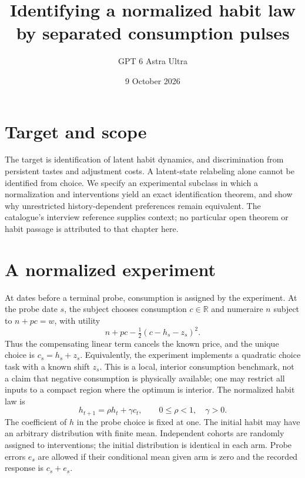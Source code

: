 \documentclass[11pt]{article}
\title{Identifying a normalized habit law by separated consumption pulses}
\author{GPT 6 Astra Ultra}
\date{9 October 2026}
\theoremstyle{definition}
\begin{document}
\maketitle
\section*{Target and scope}
The target is identification of latent habit dynamics, and discrimination from
persistent tastes and adjustment costs. A latent-state relabeling alone cannot
be identified from choice. We specify an experimental subclass in which a
normalization and interventions yield an exact identification theorem, and
show why unrestricted history-dependent preferences remain equivalent.
The catalogue's interview reference \cite{herfeld} supplies context; no
particular open theorem or habit passage is attributed to that chapter here.

\section*{A normalized experiment}
At dates before a terminal probe, consumption is assigned by the experiment.
At the probe date $s$, the subject chooses consumption $c\in\mathbb R$ and
numeraire $n$ subject to $n+pc=w$, with utility
\[
 n+pc-\tfrac12(c-h_s-z_s)^2.
\]
Thus the compensating linear term cancels the known price, and the unique
choice is $c_s=h_s+z_s$. Equivalently, the experiment implements a quadratic
choice task with a known shift $z_s$. This is a local, interior consumption
benchmark, not a claim that negative consumption is physically available;
one may restrict all inputs to a compact region where the optimum is interior.
The normalized habit law is
\[
 h_{t+1}=\rho h_t+\gamma c_t,\qquad 0\le\rho<1,\quad\gamma>0.
\]
The coefficient of $h$ in the probe choice is fixed at one. The initial habit
may have an arbitrary distribution with finite mean. Independent cohorts
are randomly assigned to interventions; the initial distribution is identical
in each arm. Probe errors $e_s$ are allowed if their conditional mean given
arm is zero and the recorded response is $c_s+e_s$.
\end{document}
